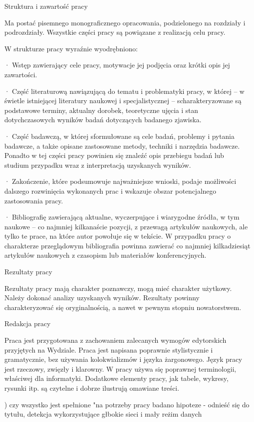 Struktura i zawartość pracy

Ma postać pisemnego monograficznego opracowania, podzielonego na rozdziały i podrozdziały. Wszystkie części pracy są powiązane z realizacją celu pracy.

W strukturze pracy wyraźnie wyodrębniono:

·         Wstęp zawierający cele pracy, motywacje jej podjęcia oraz krótki opis jej zawartości.

·         Część literaturową nawiązującą do tematu i problematyki pracy, w której – w świetle istniejącej literatury naukowej i specjalistycznej – scharakteryzowane są podstawowe terminy, aktualny dorobek, teoretyczne ujęcia i stan dotychczasowych wyników badań dotyczących badanego zjawiska.

·         Część badawczą, w której sformułowane są cele badań, problemy i pytania badawcze, a także opisane zastosowane metody, techniki i narzędzia badawcze. Ponadto w tej części pracy powinien się znaleźć opis przebiegu badań lub studium przypadku wraz z interpretacją uzyskanych wyników.

·         Zakończenie, które podsumowuje najważniejsze wnioski, podaje możliwości dalszego rozwinięcia wykonanych prac i wskazuje obszar potencjalnego zastosowania pracy.

·         Bibliografię zawierającą aktualne, wyczerpujące i wiarygodne źródła, w tym naukowe – co najmniej kilkanaście pozycji, z przewagą artykułów naukowych, ale tylko te prace, na które autor powołuje się w tekście. W przypadku pracy o charakterze przeglądowym bibliografia powinna zawierać co najmniej kilkadziesiąt artykułów naukowych z czasopism lub materiałów konferencyjnych.

Rezultaty pracy

Rezultaty pracy mają charakter poznawczy, mogą mieć charakter użytkowy. Należy dokonać analizy uzyskanych wyników. Rezultaty powinny charakteryzować się oryginalnością, a nawet w pewnym stopniu nowatorstwem.

Redakcja pracy

Praca jest przygotowana z zachowaniem zalecanych wymogów edytorskich przyjętych na Wydziale. Praca jest napisana poprawnie stylistycznie i gramatycznie, bez używania kolokwializmów i języka żargonowego. Język pracy jest rzeczowy, zwięzły i klarowny. W pracy używa się poprawnej terminologii, właściwej dla informatyki. Dodatkowe elementy pracy, jak tabele, wykresy, rysunki itp. są czytelne i dobrze ilustrują omawiane treści.

) czy wszystko jest spełnione
"na potrzeby pracy badano hipoteze - odnieść się do tytułu, detekcja wykorzystujące głbokie sieci i mały reżim danych
